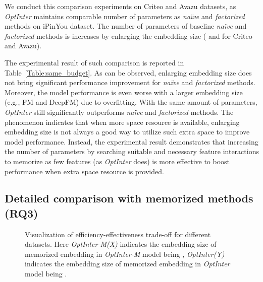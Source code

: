 \documentclass[conference]{IEEEtran}
\begin{document}
We conduct this comparison experiments on Criteo and Avazu datasets, as \textit{OptInter} maintains comparable number of parameters as \emph{naïve} and \emph{factorized} methods on iPinYou dataset. The number of parameters of baseline \emph{naïve} and \emph{factorized} methods is increases by enlarging the embedding size ( and  for Criteo and Avazu).

The experimental result of such comparison is reported in Table~\ref{Table:same_budget}. 
As can be observed, enlarging embedding size does not bring significant performance improvement for \emph{naïve} and \emph{factorized} methods. Moreover, the model performance is even worse with a larger embedding size (e.g., FM and DeepFM) due to overfitting.
With the same amount of parameters, \textit{OptInter} still significantly outperforms \emph{naïve} and \emph{factorized} methods. The phenomenon indicates that when more space resource is available, enlarging embedding size is not always a good way to utilize such extra space to improve model performance. Instead, the experimental result demonstrates that increasing the number of parameters by searching suitable and necessary feature interactions to memorize as few features (as \textit{OptInter} does) is more effective to boost performance when extra space resource is provided. 

\subsection{Detailed comparison with memorized methods (RQ3)}

\begin{figure}[!htbp]
\centering
{}
\caption{Visualization of efficiency-effectiveness trade-off for different datasets.  Here \textit{OptInter-M(X)} indicates the embedding size of memorized embedding in \textit{OptInter-M} model being , \textit{OptInter(Y)} indicates the embedding size of memorized embedding in \textit{OptInter} model being .
}
\label{fig:param_AUC}
\end{figure}
\end{document}
